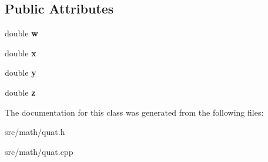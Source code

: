 \subsection*{Public Attributes}
\begin{DoxyCompactItemize}
\item 
\hypertarget{classmath_1_1quat_a5f5eb994694bfb16fffc1bbfa8865305}{
double {\bfseries w}}
\label{classmath_1_1quat_a5f5eb994694bfb16fffc1bbfa8865305}

\item 
\hypertarget{classmath_1_1quat_a344e9a3322595602c0d27d410ab5e0e4}{
double {\bfseries x}}
\label{classmath_1_1quat_a344e9a3322595602c0d27d410ab5e0e4}

\item 
\hypertarget{classmath_1_1quat_a270052a715675dce2740c9e29db72297}{
double {\bfseries y}}
\label{classmath_1_1quat_a270052a715675dce2740c9e29db72297}

\item 
\hypertarget{classmath_1_1quat_a3a9fb8daa232089f7410d91ee2fd2d65}{
double {\bfseries z}}
\label{classmath_1_1quat_a3a9fb8daa232089f7410d91ee2fd2d65}

\end{DoxyCompactItemize}


The documentation for this class was generated from the following files:\begin{DoxyCompactItemize}
\item 
src/math/quat.h\item 
src/math/quat.cpp\end{DoxyCompactItemize}
